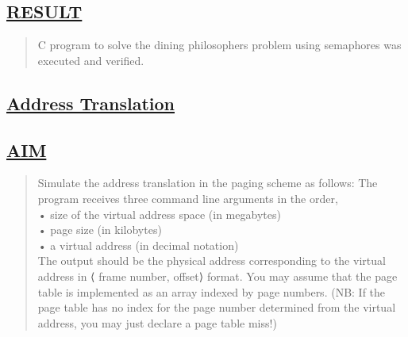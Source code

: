 \documentclass[a4paper, 12pt]{article}
\begin{document}

\subsection*{\underline{RESULT}}
\begin{quote}
C program to solve the dining philosophers problem using semaphores was executed and verified.
\end{quote}

\newpage
\begin{center}
\section*{\LARGE \textbf{\underline{Address Translation}}} 
\end{center}

\subsection*{\underline{AIM}}
\begin{quote}
Simulate the address translation in the paging scheme as follows: The program receives three command line arguments in the order,\\
• size of the virtual address space (in megabytes)\\
• page size (in kilobytes)\\
• a virtual address (in decimal notation)\\
The output should be the physical address corresponding to the virtual address in ⟨ frame number, offset⟩ format. You may assume that the page table is implemented as an array indexed by page numbers. (NB: If the page table has no index for the page number determined from the virtual address, you may just declare a page table miss!)\\
\end{quote}
\end{document}

